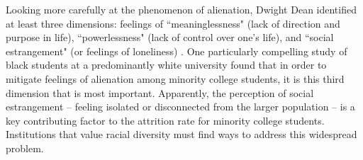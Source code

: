 Looking more carefully at the phenomenon of alienation, Dwight Dean identified
at least three dimensions: feelings of ``meaninglessness" (lack of direction
and purpose in life), ``powerlessness" (lack of control over one's life), and
``social estrangement" (or feelings of loneliness)
\cite{dean_alienation_1961}. One particularly compelling study of black
students at a predominantly white university \cite{suen_alienation_1983} found
that in order to mitigate feelings of alienation among minority college
students, it is this third dimension that is most important. Apparently, the
perception of social estrangement -- feeling isolated or disconnected from the
larger population -- is a key contributing factor to the attrition rate for
minority college students. Institutions that value racial diversity must find
ways to address this widespread problem.

